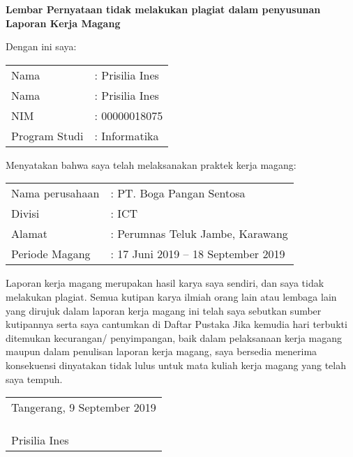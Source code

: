 \begin{center}
    \textbf{Lembar Pernyataan tidak melakukan plagiat dalam penyusunan Laporan Kerja Magang}
\end{center}

\noindent Dengan ini saya:
\begin{flushleft}
    \begin{tabular}{ll}
    Nama          & : Prisilia Ines \\
    Nama          & : Prisilia Ines \\
    NIM           & : 00000018075   \\
    Program Studi & : Informatika  
    \end{tabular}
\end{flushleft}
\noindent Menyatakan bahwa saya telah melaksanakan praktek kerja magang:
\begin{flushleft}    
    \begin{tabular}{ll}
    Nama perusahaan & : PT. Boga Pangan Sentosa          \\
    Divisi          & : ICT                              \\
    Alamat          & : Perumnas Teluk Jambe, Karawang   \\
    Periode Magang  & : 17 Juni 2019 – 18 September 2019
    \end{tabular}
\end{flushleft}
    \noindent Laporan kerja magang merupakan hasil karya saya sendiri, dan saya tidak melakukan plagiat. 
    Semua kutipan karya ilmiah orang lain atau lembaga lain yang dirujuk dalam laporan 
    kerja magang ini telah saya sebutkan sumber kutipannya serta saya cantumkan di Daftar Pustaka
Jika kemudia hari terbukti ditemukan kecurangan/ penyimpangan, baik dalam pelaksanaan kerja 
magang maupun dalam penulisan laporan kerja magang, saya bersedia menerima konsekuensi dinyatakan 
tidak lulus untuk mata kuliah kerja magang yang telah saya tempuh.\\

\noindent \begin{tabular}{l}
Tangerang, 9 September 2019 \\
                            \\
                            \\
                            \\
Prisilia Ines              
\end{tabular}
